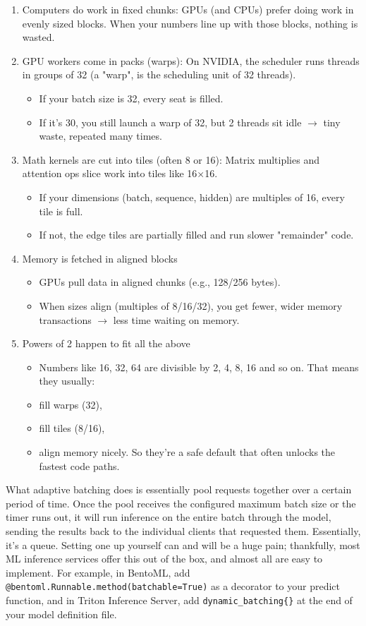 \begin{enumerate}
	\item Computers do work in fixed chunks: GPUs (and CPUs) prefer doing work in evenly sized blocks. When your numbers line up with those blocks, nothing is wasted.
	\item GPU workers come in packs (warps): On NVIDIA, the scheduler runs threads in groups of 32 (a "warp", is the scheduling unit of 32 threads).
		\begin{itemize}
			\item If your batch size is 32, every seat is filled.
			\item If it's 30, you still launch a warp of 32, but 2 threads sit
				idle $\to$ tiny waste, repeated many times.
		\end{itemize}
	\item Math kernels are cut into tiles (often 8 or 16): Matrix multiplies and attention ops slice work into tiles like 16×16.
		\begin{itemize}
			\item If your dimensions (batch, sequence, hidden) are multiples
				of 16, every tile is full. 
			\item If not, the edge tiles are partially filled and run
				slower "remainder" code.
		\end{itemize}
	\item Memory is fetched in aligned blocks
		\begin{itemize}
			\item GPUs pull data in aligned chunks (e.g., 128/256 bytes).
			\item When sizes align (multiples of 8/16/32), you get fewer,
				wider memory transactions $\to$ less time waiting on memory.
		\end{itemize}
	\item Powers of 2 happen to fit all the above
		\begin{itemize}
			\item Numbers like 16, 32, 64 are divisible by 2, 4, 8, 16 and so on. That means they usually:
			\item  fill warps (32),
			\item  fill tiles (8/16),
			\item  align memory nicely. So they're a safe default that often unlocks the fastest code paths. 
		\end{itemize}
\end{enumerate}

What adaptive batching does is essentially pool requests together over a certain period of time. Once the pool receives the configured maximum batch size or the timer runs out, it will run inference on the entire batch through the model, sending the results back to the individual clients that requested them. Essentially, it's a queue. Setting one up yourself can and will be a huge pain; thankfully, most ML inference services offer this out of the box, and almost all are easy to implement. For example, in BentoML, add \texttt{@bentoml.Runnable.method(batchable=True)} as a decorator to your predict function, and in Triton Inference Server, add \texttt{dynamic\_batching\{\}} at the end of your model definition file.


